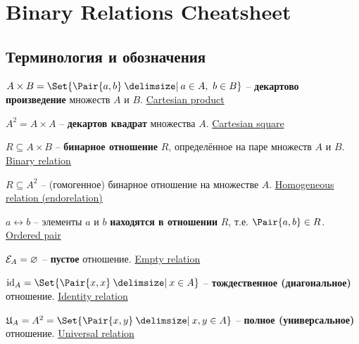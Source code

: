 \documentclass[a4paper,10pt]{article}
\begin{document}
\setcounter{section}{1}
\section{Binary Relations Cheatsheet}

\subsection{Терминология и обозначения}

\begin{terms}
    \item $A \times B = \Set{\Pair{a,b} \given a \in A,~ b \in B}$ \--- \textbf{декартово произведение} множеств $A$ и $B$.
    \hfill\href{https://en.wikipedia.org/wiki/Cartesian_product}{Cartesian product}

    \item $A^2 = A \times A$ \--- \textbf{декартов квадрат} множества $A$.
    \hfill\href{https://en.wikipedia.org/wiki/Cartesian_product\#n-ary_Cartesian_power}{Cartesian square}

    \item $R \subseteq A \times B$ \--- \textbf{бинарное отношение} $R$, определённое на паре множеств $A$ и $B$.
    \hfill\href{https://en.wikipedia.org/wiki/Binary_relation}{Binary relation}

    \item $R \subseteq A^2$ \--- (гомогенное) бинарное отношение на множестве $A$.
    \hfill\href{https://en.wikipedia.org/wiki/Homogeneous_relation}{Homogeneous relation (endorelation)}

    \item $a \rel b$ \--- элементы $a$ и $b$ \textbf{находятся в отношении} $R$, т.е. $\Pair{a,b} \in R$.
    \hfill\href{https://en.wikipedia.org/wiki/Ordered_pair}{Ordered pair}

    \item $\mathcal{E}_{A} = \varnothing$ \--- \textbf{пустое} отношение.
    \hfill\href{https://en.wikipedia.org/wiki/Homogeneous_relation#Particular_homogeneous_relations}{Empty relation}

    \item $\idrel{A} = \Set{\Pair{x,x} \given x \in A}$ \--- \textbf{тождественное (диагональное)} отношение.
    \hfill\href{https://en.wikipedia.org/wiki/Homogeneous_relation#Particular_homogeneous_relations}{Identity relation}

    \item $\universalrel{A} = A^2 = \Set{\Pair{x,y} \given x,y \in A}$ \--- \textbf{полное (универсальное)} отношение.
    \hfill\href{https://en.wikipedia.org/wiki/Homogeneous_relation#Particular_homogeneous_relations}{Universal relation}

\end{terms}
\end{document}
